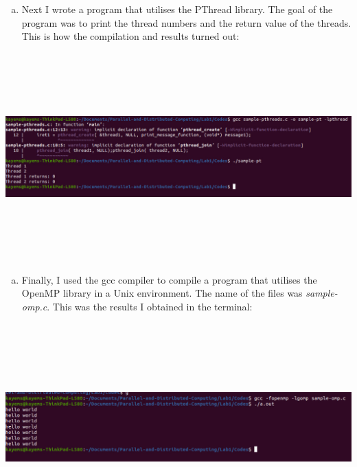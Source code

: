 \documentclass[12pt, a4paper, fleqn, titlepage]{article}
\begin{document}
    \begin{enumerate}[d.]
        \item Next I wrote a program that utilises the PThread library. The goal of the program was to print the thread numbers and the return value of the threads. This is how the compilation and results turned out: 
    \end{enumerate}

    \begin{center}
        \includegraphics[width= 17cm,height = 8cm, keepaspectratio,scale=0.5]{pt}
    \end{center}

    \begin{enumerate}[e.]
        \item Finally, I used the gcc compiler to compile a program that utilises the OpenMP library in a Unix environment. The name of the files was \emph{sample-omp.c}. This was the results I obtained in the terminal:
        
    \end{enumerate}

    \begin{center}
        \includegraphics[width= 17cm,height = 8cm, keepaspectratio,scale=0.5]{omp}
    \end{center}
\end{document}
